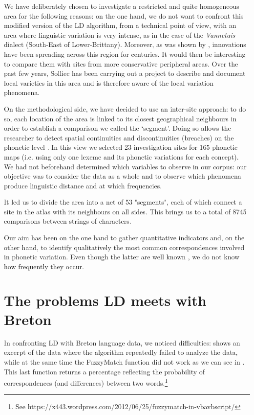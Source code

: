 \documentclass[output=paper]{LSP/langsci}
\begin{document}
We have deliberately chosen to investigate a restricted and quite homogeneous area for the following reasons: on the one hand, we do not want to confront this modified version of the LD algorithm, from a technical point of view, with an area where linguistic variation is very intense, as in the case of the \textit{Vannetais} dialect (South-East of Lower-Brittany). Moreover, as was shown by \citet{falchun_perspectives_1981}, innovations have been spreading across this region for centuries. It would then be interesting to compare them with sites from more conservative peripheral areas. Over the past few years, Solliec has been carrying out a project to describe and document local varieties in this area and is therefore aware of the local variation phenomena.

On the methodological side, we have decided to use an inter-site approach: to do so, each location of the area is linked to its closest geographical neighbours in order to establish a comparison we called the ‘segment’. Doing so allows the researcher to detect spatial continuities and discontinuities (breaches) on the phonetic level \citep[137]{goebl_introduction_2012}. In this view we selected 23 investigation sites for 165 phonetic maps (i.e. using only one lexeme and its phonetic variations for each concept). We had not beforehand determined which variables to observe in our corpus: our objective was to consider the data as a whole and to observe which phenomena produce linguistic distance and at which frequencies.

It led us to divide the area into a net of 53 "segments", each of which connect a site in the atlas with its neighbours on all sides. This brings us to a total of 8745 comparisons between strings of characters.

Our aim has been on the one hand to gather quantitative indicators and, on the other hand, to identify qualitatively the most common correspondences involved in phonetic variation. Even though the latter are well known \citep{falchun_perspectives_1981,jackson_historical_1967}, we do not know how frequently they occur.

\section{The problems LD meets with Breton}

In confronting LD with Breton language data, we noticed difficulties:  shows an excerpt of the data where the algorithm repeatedly failed to analyze the data, while at the same time the FuzzyMatch function did not work as we can see in . This last function returns a percentage reflecting the probability of correspondences (and differences) between two words.\footnote{See  https://x443.wordpress.com/2012/06/25/fuzzymatch-in-vbavbscript/}
\end{document}
